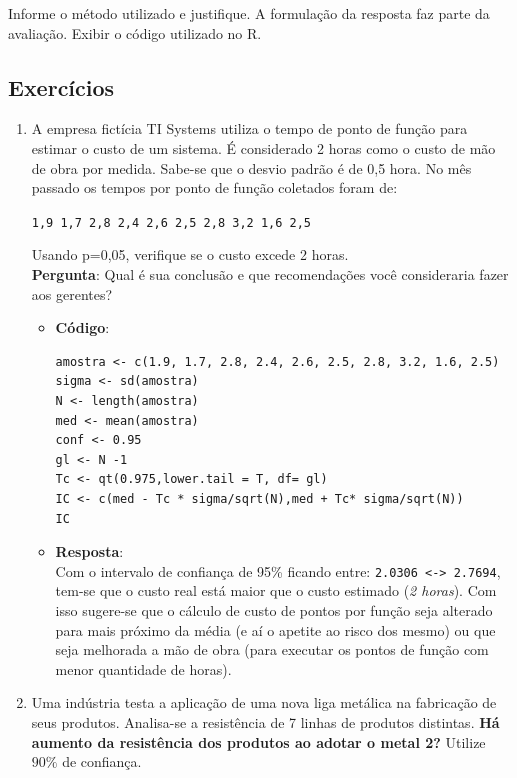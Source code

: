 \documentclass[a4paper,12pt]{article}
\begin{document}
Informe o método utilizado e justifique. A formulação da resposta faz parte da avaliação. Exibir o código utilizado no R.

\subsection{Exercícios}

\begin{enumerate}
    \item A empresa fictícia TI Systems utiliza o tempo de ponto de função para estimar o custo de um sistema.\newline
    É considerado 2 horas como o custo de mão de obra por medida. Sabe-se que o desvio padrão é de 0,5 hora. \newline
    No mês passado os tempos por ponto de função coletados foram de:
    \begin{center}
\texttt{1,9  1,7  2,8  2,4  2,6  2,5  2,8  3,2  1,6  2,5} \\
    \end{center}
    Usando p=0,05, verifique se o custo excede 2 horas. \\
    \textbf{Pergunta}: Qual é sua conclusão e que recomendações você consideraria fazer aos gerentes? 
    \begin{itemize}
        \item \textbf{Código}:
        \begin{lstlisting}[language=Rlang]
amostra <- c(1.9, 1.7, 2.8, 2.4, 2.6, 2.5, 2.8, 3.2, 1.6, 2.5)
sigma <- sd(amostra)
N <- length(amostra)
med <- mean(amostra)
conf <- 0.95
gl <- N -1
Tc <- qt(0.975,lower.tail = T, df= gl)
IC <- c(med - Tc * sigma/sqrt(N),med + Tc* sigma/sqrt(N))
IC
        \end{lstlisting}
        \item \textbf{Resposta}:\\
        Com o intervalo de confiança de 95\% ficando entre: \texttt{2.0306 <-> 2.7694},
        tem-se que o custo real está maior que o custo estimado (\textit{2 horas}). Com isso sugere-se que o cálculo de custo de pontos por função seja alterado para mais próximo da média (e aí o apetite ao risco dos mesmo) ou que seja melhorada a mão de obra (para executar os pontos de função com menor quantidade de horas).
    \end{itemize}
    \item Uma indústria testa a aplicação de uma nova liga metálica na fabricação de seus produtos. Analisa-se a resistência de 7 linhas de produtos distintas. \textbf{Há aumento da resistência dos produtos ao adotar o metal 2?} Utilize $90\%$ de confiança. 

\end{enumerate}
\end{document}
